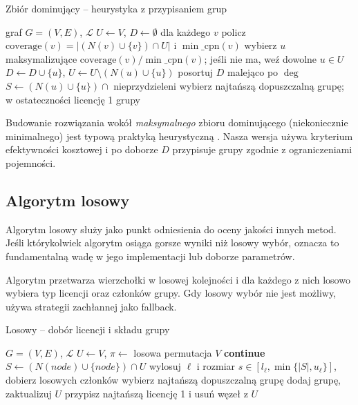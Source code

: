 \begin{algorithm}[H]
  \caption{Zbiór dominujący -- heurystyka z przypisaniem grup}
  \label{alg:ds}
  \begin{algorithmic}[1]
    \Require graf $G=(V,E)$, $\mathcal{L}$
    \State $U\gets V$, $D\gets\emptyset$
    \State dla każdego $v$ policz $\mathrm{coverage}(v)=|(N(v)\cup\{v\})\cap U|$ i $\min\_\mathrm{cpn}(v)$
    \State wybierz $u$ maksymalizujące $\mathrm{coverage}(v)/\min\_\mathrm{cpn}(v)$; jeśli nie ma, weź dowolne $u\in U$
    \State $D\gets D\cup\{u\}$, $U\gets U\setminus(N(u)\cup\{u\})$
    \EndWhile
    \State posortuj $D$ malejąco po $\deg$
    \State $S\gets(N(u)\cup\{u\})\cap$ nieprzydzieleni
    \State wybierz najtańszą dopuszczalną grupę; w ostateczności licencję 1
    \EndFor
    \State \Return grupy
  \end{algorithmic}
\end{algorithm}

Budowanie rozwiązania wokół \emph{maksymalnego} zbioru dominującego (niekoniecznie minimalnego) jest typową praktyką heurystyczną \cite{haynes1998domination}. Nasza wersja używa kryterium efektywności kosztowej i po doborze $D$ przypisuje grupy zgodnie z ograniczeniami pojemności.

\subsection{Algorytm losowy}\label{subsec:random}

Algorytm losowy służy jako punkt odniesienia do oceny jakości innych metod. Jeśli którykolwiek algorytm osiąga gorsze wyniki niż losowy wybór, oznacza to fundamentalną wadę w jego implementacji lub doborze parametrów.

Algorytm przetwarza wierzchołki w losowej kolejności i dla każdego z nich losowo wybiera typ licencji oraz członków grupy. Gdy losowy wybór nie jest możliwy, używa strategii zachłannej jako fallback.

\begin{algorithm}[H]
  \caption{Losowy -- dobór licencji i składu grupy}
  \label{alg:randomized}
  \begin{algorithmic}[1]
    \Require $G=(V,E)$, $\mathcal{L}$
    \State $U\gets V$, $\pi\gets$ losowa permutacja $V$
     \textbf{continue}\EndIf
    \State $S\gets(N(node)\cup\{node\})\cap U$
    \State wylosuj $\ell$ i rozmiar $s\in[l_\ell,\min\{|S|,u_\ell\}]$, dobierz losowych członków
    \Else
    \State wybierz najtańszą dopuszczalną grupę
    \EndIf
    \State dodaj grupę, zaktualizuj $U$
    \EndFor
     przypisz najtańszą licencję 1 i usuń węzeł z $U$ \EndWhile
  \end{algorithmic}
\end{algorithm}



